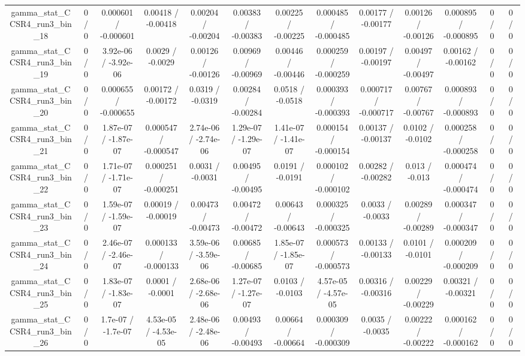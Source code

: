 \documentclass[10pt]{article}
\begin{document}
\begin{table}[htbp]
\begin{center}
\begin{tabular}{|c|c|c|c|c|c|c|c|c|c|c|c|c|}
  gamma_stat_CCSR4_run3_bin_18 & 0 / 0 & 0.000601 / -0.000601 & 0.00418 / -0.00418 & 0.00204 / -0.00204 & 0.00383 / -0.00383 & 0.00225 / -0.00225 & 0.000485 / -0.000485 & 0.00177 / -0.00177 & 0.00126 / -0.00126 & 0.000895 / -0.000895 & 0 / 0 & 0 / 0 \\ 
  gamma_stat_CCSR4_run3_bin_19 & 0 / 0 & 3.92e-06 / -3.92e-06 & 0.0029 / -0.0029 & 0.00126 / -0.00126 & 0.00969 / -0.00969 & 0.00446 / -0.00446 & 0.000259 / -0.000259 & 0.00197 / -0.00197 & 0.00497 / -0.00497 & 0.00162 / -0.00162 & 0 / 0 & 0 / 0 \\ 
  gamma_stat_CCSR4_run3_bin_20 & 0 / 0 & 0.000655 / -0.000655 & 0.00172 / -0.00172 & 0.0319 / -0.0319 & 0.00284 / -0.00284 & 0.0518 / -0.0518 & 0.000393 / -0.000393 & 0.000717 / -0.000717 & 0.00767 / -0.00767 & 0.000893 / -0.000893 & 0 / 0 & 0 / 0 \\ 
  gamma_stat_CCSR4_run3_bin_21 & 0 / 0 & 1.87e-07 / -1.87e-07 & 0.000547 / -0.000547 & 2.74e-06 / -2.74e-06 & 1.29e-07 / -1.29e-07 & 1.41e-07 / -1.41e-07 & 0.000154 / -0.000154 & 0.00137 / -0.00137 & 0.0102 / -0.0102 & 0.000258 / -0.000258 & 0 / 0 & 0 / 0 \\ 
  gamma_stat_CCSR4_run3_bin_22 & 0 / 0 & 1.71e-07 / -1.71e-07 & 0.000251 / -0.000251 & 0.0031 / -0.0031 & 0.00495 / -0.00495 & 0.0191 / -0.0191 & 0.000102 / -0.000102 & 0.00282 / -0.00282 & 0.013 / -0.013 & 0.000474 / -0.000474 & 0 / 0 & 0 / 0 \\ 
  gamma_stat_CCSR4_run3_bin_23 & 0 / 0 & 1.59e-07 / -1.59e-07 & 0.00019 / -0.00019 & 0.00473 / -0.00473 & 0.00472 / -0.00472 & 0.00643 / -0.00643 & 0.000325 / -0.000325 & 0.0033 / -0.0033 & 0.00289 / -0.00289 & 0.000347 / -0.000347 & 0 / 0 & 0 / 0 \\ 
  gamma_stat_CCSR4_run3_bin_24 & 0 / 0 & 2.46e-07 / -2.46e-07 & 0.000133 / -0.000133 & 3.59e-06 / -3.59e-06 & 0.00685 / -0.00685 & 1.85e-07 / -1.85e-07 & 0.000573 / -0.000573 & 0.00133 / -0.00133 & 0.0101 / -0.0101 & 0.000209 / -0.000209 & 0 / 0 & 0 / 0 \\ 
  gamma_stat_CCSR4_run3_bin_25 & 0 / 0 & 1.83e-07 / -1.83e-07 & 0.0001 / -0.0001 & 2.68e-06 / -2.68e-06 & 1.27e-07 / -1.27e-07 & 0.0103 / -0.0103 & 4.57e-05 / -4.57e-05 & 0.00316 / -0.00316 & 0.00229 / -0.00229 & 0.00321 / -0.00321 & 0 / 0 & 0 / 0 \\ 
  gamma_stat_CCSR4_run3_bin_26 & 0 / 0 & 1.7e-07 / -1.7e-07 & 4.53e-05 / -4.53e-05 & 2.48e-06 / -2.48e-06 & 0.00493 / -0.00493 & 0.00664 / -0.00664 & 0.000309 / -0.000309 & 0.0035 / -0.0035 & 0.00222 / -0.00222 & 0.000162 / -0.000162 & 0 / 0 & 0 / 0 \\ 

\end{tabular}
\end{center}
\end{table}
\end{document}
